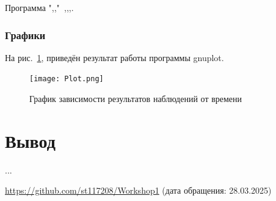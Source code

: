 Программа ",,"\verb| |,,,.


\subsubsection{Графики}

На рис.~\ref{fig:plot}, приведён результат работы программы gnuplot.

\begin{figure}
\centering
\texttt{[image: Plot.png]}
\caption{График зависимости результатов наблюдений от времени}
\label{fig:plot}
\end{figure}

\section{Вывод}
... 

\begin{thebibliography}{9}
\url{https://github.com/st117208/Workshop1}  (дата обращения: 28.03.2025)
\end{thebibliography}